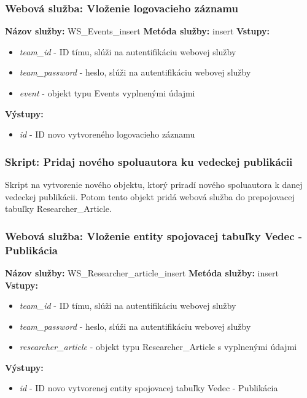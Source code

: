 \documentclass[10pt,oneside,slovak,a4paper]{article}
\begin{document}
\subsubsection{Webová služba: Vloženie logovacieho záznamu}
\textbf{Názov služby:} WS\_Events\_insert
\textbf{Metóda služby:} insert
\textbf{Vstupy:}
	\begin{itemize}
		\item \textit{team\_id} - ID tímu, slúži na autentifikáciu webovej služby
		\item \textit{team\_password} - heslo, slúži na autentifikáciu webovej služby
		\item \textit{event} - objekt typu Events vyplnenými údajmi
	\end{itemize}
\textbf{Výstupy:}
	\begin{itemize}
		\item \textit{id} - ID novo vytvoreného logovacieho záznamu
	\end{itemize}
	
\subsubsection{Skript: Pridaj nového spoluautora ku vedeckej publikácii}
Skript na vytvorenie nového objektu, ktorý priradí nového spoluautora k danej vedeckej publikácii. Potom tento objekt pridá webová služba do prepojovacej tabuľky Researcher\_Article.

\subsubsection{Webová služba: Vloženie entity spojovacej tabuľky Vedec - Publikácia}
\textbf{Názov služby:} WS\_Researcher\_article\_insert
\textbf{Metóda služby:} insert
\textbf{Vstupy:}
	\begin{itemize}
		\item \textit{team\_id} - ID tímu, slúži na autentifikáciu webovej služby
		\item \textit{team\_password} - heslo, slúži na autentifikáciu webovej služby
		\item \textit{researcher\_article} - objekt typu Researcher\_Article s vyplnenými údajmi
	\end{itemize}
\textbf{Výstupy:}
	\begin{itemize}
		\item \textit{id} - ID novo vytvorenej entity spojovacej tabuľky Vedec - Publikácia
	\end{itemize}
	
\end{document}
